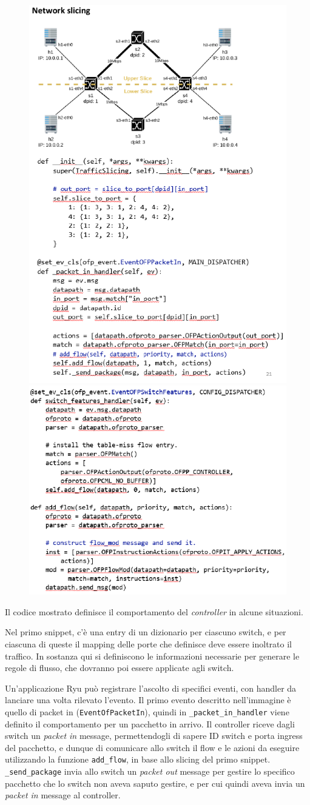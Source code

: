 \begin{figure}[htbp]
   \centering
   \includegraphics[width=0.49\columnwidth]{images/questions/Schermata del 2023-11-03 14-33-14.png}
   \includegraphics[width=0.49\columnwidth]{images/questions/Schermata del 2023-11-03 14-33-37.png}
   \label{fig:dom2.14.1}
\end{figure}

Il codice mostrato definisce il comportamento del \textit{controller} in alcune situazioni.

Nel primo snippet, c'è una entry di un dizionario per ciascuno switch, e per ciascuna di queste il mapping delle porte che definisce deve essere inoltrato il traffico.
In sostanza qui si definiscono le informazioni necessarie per generare le regole di flusso, che dovranno poi essere applicate agli switch.


Un'applicazione Ryu può registrare l'ascolto di specifici eventi, con handler da lanciare una volta rilevato l'evento. Il primo evento descritto nell'immagine è quello di packet in (\lstinline{EventOfPacketIn}), quindi in \lstinline{_packet_in_handler} viene definito il comportamento per un pacchetto in arrivo.
Il controller riceve dagli switch un \textit{packet in} message, permettendogli di sapere ID switch e porta ingress del pacchetto, e dunque di comunicare allo switch il flow e le azioni da eseguire utilizzando la funzione \lstinline{add_flow}, in base allo slicing del primo snippet.
\lstinline{_send_package} invia allo switch un \textit{packet out} message per gestire lo specifico pacchetto che lo switch non aveva saputo gestire, e per cui quindi aveva invia un \textit{packet in} message al controller.

